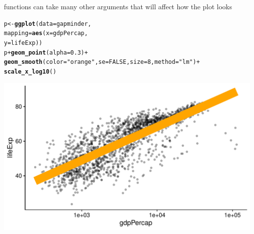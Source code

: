 \documentclass[10pt,handout]{beamer}\usepackage[]{graphicx}\usepackage[]{color}
\makeatletter
\def\maxwidth{ %
  \ifdim\Gin@nat@width>\linewidth
    \linewidth
  \else
    \Gin@nat@width
  \fi
}
\newcommand{\hlnum}[1]{\textcolor[rgb]{0.686,0.059,0.569}{#1}}%
\newcommand{\hlstr}[1]{\textcolor[rgb]{0.192,0.494,0.8}{#1}}%
\newcommand{\hlopt}[1]{\textcolor[rgb]{0,0,0}{#1}}%
\newcommand{\hlstd}[1]{\textcolor[rgb]{0.345,0.345,0.345}{#1}}%
\newcommand{\hlkwb}[1]{\textcolor[rgb]{0.69,0.353,0.396}{#1}}%
\newcommand{\hlkwc}[1]{\textcolor[rgb]{0.333,0.667,0.333}{#1}}%
\newcommand{\hlkwd}[1]{\textcolor[rgb]{0.737,0.353,0.396}{\textbf{#1}}}%
\newenvironment{kframe}{%
 \def\at@end@of@kframe{}%
 \ifinner\ifhmode%
  \def\at@end@of@kframe{\end{minipage}}%
  \begin{minipage}{\columnwidth}%
 \fi\fi%
 \def\FrameCommand##1{\hskip\@totalleftmargin \hskip-\fboxsep
 \colorbox{shadecolor}{##1}\hskip-\fboxsep
     \hskip-\linewidth \hskip-\@totalleftmargin \hskip\columnwidth}%
 \MakeFramed {\advance\hsize-\width
   \@totalleftmargin\z@ \linewidth\hsize
   \@setminipage}}%
 {\par\unskip\endMakeFramed%
 \at@end@of@kframe}
\newenvironment{knitrout}{}{} %
\makeatother
\begin{document}
\begin{frame}[fragile]{ functions can take many other arguments that will affect how the plot looks}
\begin{knitrout}\tiny
{}\color{fgcolor}\begin{kframe}
\begin{alltt}
\hlstd{p} \hlkwb{<-} \hlkwd{ggplot}\hlstd{(}\hlkwc{data} \hlstd{= gapminder,}
                \hlkwc{mapping} \hlstd{=} \hlkwd{aes}\hlstd{(}\hlkwc{x} \hlstd{= gdpPercap,}
                                        \hlkwc{y} \hlstd{= lifeExp))}
\hlstd{p} \hlopt{+} \hlkwd{geom_point}\hlstd{(}\hlkwc{alpha} \hlstd{=} \hlnum{0.3}\hlstd{)} \hlopt{+}
\hlkwd{geom_smooth}\hlstd{(}\hlkwc{color} \hlstd{=} \hlstr{"orange"}\hlstd{,} \hlkwc{se} \hlstd{=} \hlnum{FALSE}\hlstd{,} \hlkwc{size} \hlstd{=} \hlnum{8}\hlstd{,} \hlkwc{method} \hlstd{=} \hlstr{"lm"}\hlstd{)} \hlopt{+}
\hlkwd{scale_x_log10}\hlstd{()}
\end{alltt}
\end{kframe}

{\centering \includegraphics[width=\maxwidth]{figure/unnamed-chunk-14-1} 

}


\end{knitrout}
\end{frame}
\end{document}
